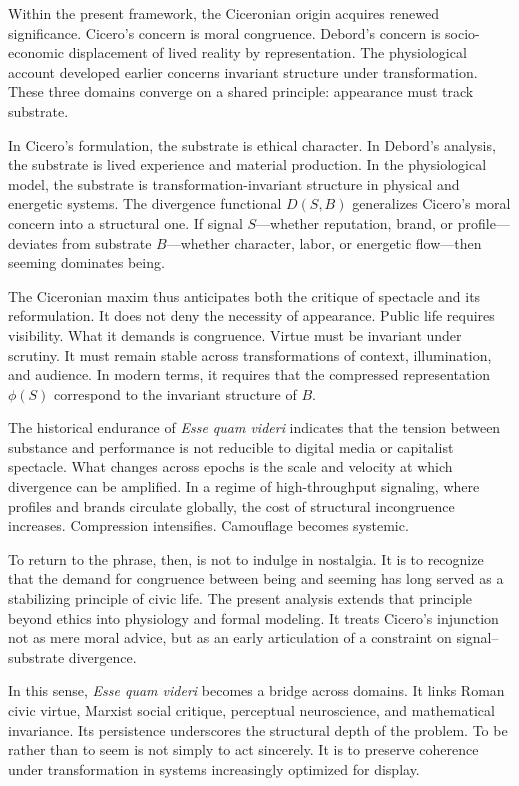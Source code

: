 \documentclass[11pt]{article}
\begin{document}
Within the present framework, the Ciceronian origin acquires renewed significance. Cicero’s concern is moral congruence. Debord’s concern is socio-economic displacement of lived reality by representation. The physiological account developed earlier concerns invariant structure under transformation. These three domains converge on a shared principle: appearance must track substrate.

In Cicero’s formulation, the substrate is ethical character. In Debord’s analysis, the substrate is lived experience and material production. In the physiological model, the substrate is transformation-invariant structure in physical and energetic systems. The divergence functional $D(S,B)$ generalizes Cicero’s moral concern into a structural one. If signal $S$—whether reputation, brand, or profile—deviates from substrate $B$—whether character, labor, or energetic flow—then seeming dominates being.

The Ciceronian maxim thus anticipates both the critique of spectacle and its reformulation. It does not deny the necessity of appearance. Public life requires visibility. What it demands is congruence. Virtue must be invariant under scrutiny. It must remain stable across transformations of context, illumination, and audience. In modern terms, it requires that the compressed representation $\phi(S)$ correspond to the invariant structure of $B$.

The historical endurance of \textit{Esse quam videri} indicates that the tension between substance and performance is not reducible to digital media or capitalist spectacle. What changes across epochs is the scale and velocity at which divergence can be amplified. In a regime of high-throughput signaling, where profiles and brands circulate globally, the cost of structural incongruence increases. Compression intensifies. Camouflage becomes systemic.

To return to the phrase, then, is not to indulge in nostalgia. It is to recognize that the demand for congruence between being and seeming has long served as a stabilizing principle of civic life. The present analysis extends that principle beyond ethics into physiology and formal modeling. It treats Cicero’s injunction not as mere moral advice, but as an early articulation of a constraint on signal–substrate divergence.

In this sense, \textit{Esse quam videri} becomes a bridge across domains. It links Roman civic virtue, Marxist social critique, perceptual neuroscience, and mathematical invariance. Its persistence underscores the structural depth of the problem. To be rather than to seem is not simply to act sincerely. It is to preserve coherence under transformation in systems increasingly optimized for display.
\end{document}
